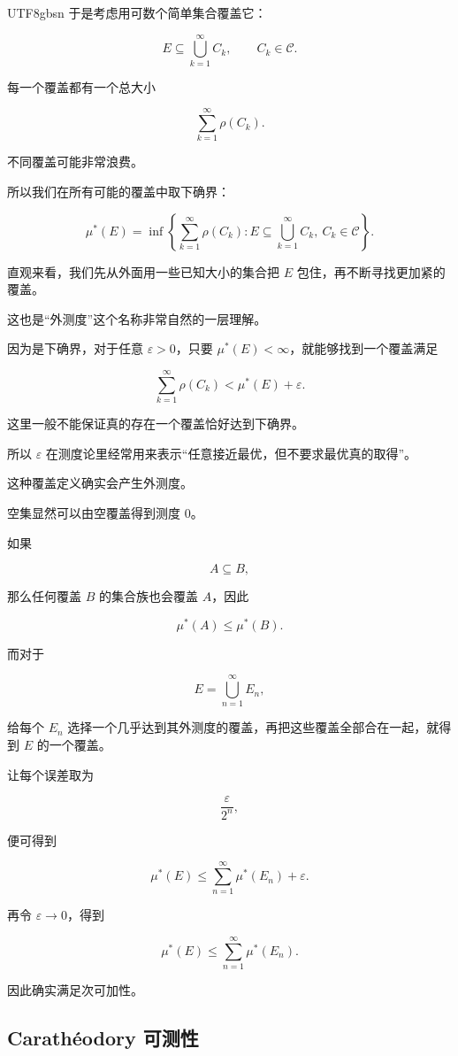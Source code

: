 \documentclass[11pt]{article}
\begin{document}
\begin{CJK*}{UTF8}{gbsn}
于是考虑用可数个简单集合覆盖它：

\[
E\subseteq\bigcup_{k=1}^{\infty}C_{k},\qquad C_{k}\in\mathcal{C}.
\]

每一个覆盖都有一个总大小

\[
\sum_{k=1}^{\infty}\rho(C_{k}).
\]

不同覆盖可能非常浪费。

所以我们在所有可能的覆盖中取下确界：

\[
\mu^{*}(E)=\inf\left\{\sum_{k=1}^{\infty}\rho(C_{k}):E\subseteq\bigcup_{k=1}^{\infty}C_{k},\ C_{k}\in\mathcal{C}\right\}.
\]

直观来看，我们先从外面用一些已知大小的集合把 $E$ 包住，再不断寻找更加紧的覆盖。

这也是“外测度”这个名称非常自然的一层理解。

因为是下确界，对于任意 $\varepsilon>0$，只要 $\mu^{*}(E)<\infty$，就能够找到一个覆盖满足

\[
\sum_{k=1}^{\infty}\rho(C_{k})<\mu^{*}(E)+\varepsilon.
\]

这里一般不能保证真的存在一个覆盖恰好达到下确界。

所以 $\varepsilon$ 在测度论里经常用来表示“任意接近最优，但不要求最优真的取得”。

这种覆盖定义确实会产生外测度。

空集显然可以由空覆盖得到测度 $0$。

如果

\[
A\subseteq B,
\]

那么任何覆盖 $B$ 的集合族也会覆盖 $A$，因此

\[
\mu^{*}(A)\leq\mu^{*}(B).
\]

而对于

\[
E=\bigcup_{n=1}^{\infty}E_{n},
\]

给每个 $E_{n}$ 选择一个几乎达到其外测度的覆盖，再把这些覆盖全部合在一起，就得到 $E$ 的一个覆盖。

让每个误差取为

\[
\frac{\varepsilon}{2^{n}},
\]

便可得到

\[
\mu^{*}(E)\leq\sum_{n=1}^{\infty}\mu^{*}(E_{n})+\varepsilon.
\]

再令 $\varepsilon\rightarrow0$，得到

\[
\mu^{*}(E)\leq\sum_{n=1}^{\infty}\mu^{*}(E_{n}).
\]

因此确实满足次可加性。

\subsection{Carathéodory 可测性}


\end{CJK*}
\end{document}
